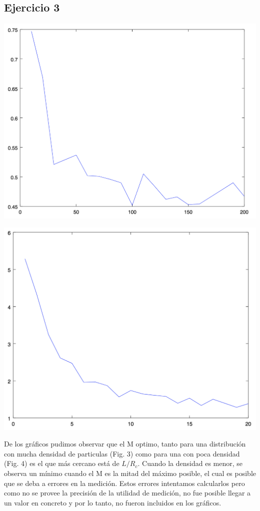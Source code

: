 \documentclass[a4paper]{article}
\begin{document}
\subsection{Ejercicio 3}
\begin{center}
  \includegraphics[width=0.75\linewidth]{ej3_1.png}
\end{center}
\begin{center}
  \includegraphics[width=0.75\linewidth]{ej3_2.png}
\end{center}
De los gráficos pudimos observar que el M optimo, tanto para una distribución con mucha densidad de particulas (Fig. 3) como para una con poca densidad (Fig. 4) es el que más cercano está de $L/R_c$.
Cuando la densidad es menor, se observa un mínimo cuando el M es la mitad del máximo posible, el cual es posible que se deba a errores en la medición. Estos errores intentamos calcularlos pero como no se provee la precisión de la utilidad de medición, no fue posible llegar a un valor en concreto y por lo tanto, no fueron incluidos en los gráficos.
\end{document}
